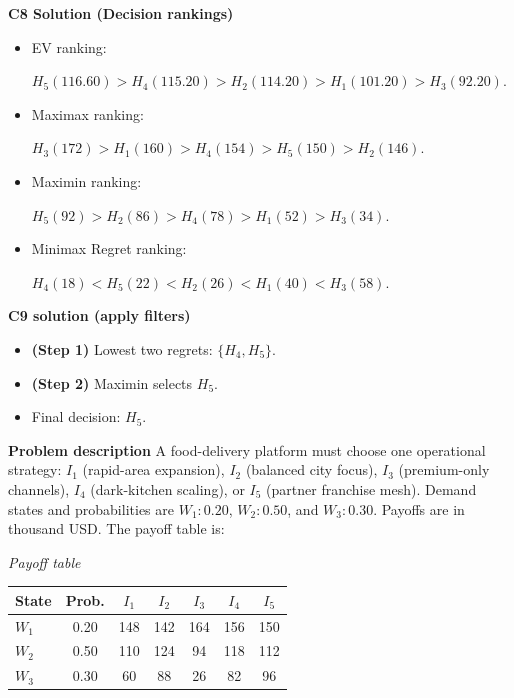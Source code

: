 \begin{ExamProblems}
		\textbf{C8 Solution (Decision rankings)}\par
		\begin{itemize}
			\item EV ranking: \par $H_5(116.60)>H_4(115.20)>H_2(114.20)>H_1(101.20)>H_3(92.20)$.
			\item Maximax ranking:\par $H_3(172)>H_1(160)>H_4(154)>H_5(150)>H_2(146)$.
			\item Maximin ranking: \par $H_5(92)>H_2(86)>H_4(78)>H_1(52)>H_3(34)$.
			\item Minimax Regret ranking:\par $H_4(18)<H_5(22)<H_2(26)<H_1(40)<H_3(58)$.
		\end{itemize}
		
		\textbf{C9 solution (apply filters)}\par
		\begin{itemize}
			\item \textbf{(Step 1)} Lowest two regrets: $\{H_4,H_5\}$.
			\item \textbf{(Step 2)} Maximin selects $H_5$.
			\item Final decision: $H_5$.
		\end{itemize}
		
		\newpage
		\item
		\textbf{Problem description}
		A food-delivery platform must choose one operational strategy: $I_1$ (rapid-area expansion), $I_2$ (balanced city focus), $I_3$ (premium-only channels), $I_4$ (dark-kitchen scaling), or $I_5$ (partner franchise mesh).
		Demand states and probabilities are $W_1:0.20$, $W_2:0.50$, and $W_3:0.30$. Payoffs are in thousand USD. The payoff table is:
		
		\begin{center}
			\textit{Payoff table} \\
			\begin{tabular}{l c c c c c c}
				\hline
				State& Prob. & $I_1$ & $I_2$ & $I_3$ & $I_4$ & $I_5$ \\
				\hline
				$W_1$ & 0.20 & 148 & 142 & 164 & 156 & 150 \\
				$W_2$ & 0.50 & 110 & 124 & 94 & 118 & 112 \\
				$W_3$ & 0.30 & 60 & 88 & 26 & 82 & 96 \\
				\hline
			\end{tabular}
		\end{center}
		

\end{ExamProblems}
